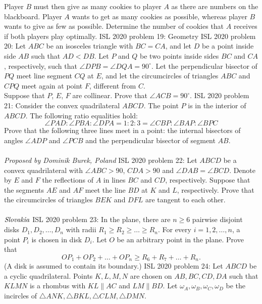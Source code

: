 Player $B$ must then give as many cookies to player $A$ as there are numbers on the blackboard. Player $A$ wants to get as many cookies as possible, whereas player $B$ wants to give as few as possible. Determine the number of cookies that $A$ receives if both players play optimally. 
ISL 2020 problem 19:  Geometry 
ISL 2020 problem 20:  Let $ABC$ be an isosceles triangle with $BC=CA$, and let $D$ be a point inside side $AB$ such that $AD< DB$. Let $P$ and $Q$ be two points inside sides $BC$ and $CA$, respectively, such that $\angle DPB = \angle DQA = 90^{\circ}$. Let the perpendicular bisector of $PQ$ meet line segment $CQ$ at $E$, and let the circumcircles of triangles $ABC$ and $CPQ$ meet again at point $F$, different from $C$. \\
Suppose that $P$, $E$, $F$ are collinear. Prove that $\angle ACB = 90^{\circ}$. 
ISL 2020 problem 21:  Consider the convex quadrilateral $ABCD$. The point $P$ is in the interior of $ABCD$. The following ratio equalities hold:
\[ \angle PAD:\angle PBA:\angle DPA=1:2:3=\angle CBP:\angle BAP:\angle BPC \]
Prove that the following three lines meet in a point: the internal bisectors of angles $\angle ADP$ and $\angle PCB$ and the perpendicular bisector of segment $AB$. \\\\
\textit{Proposed by Dominik Burek, Poland} 
ISL 2020 problem 22:  Let $ABCD$ be a convex quadrilateral with $\angle ABC>90$, $CDA>90$ and $\angle DAB=\angle BCD$. Denote by $E$ and $F$ the reflections of $A$ in lines $BC$ and $CD$, respectively. Suppose that the segments $AE$ and $AF$ meet the line $BD$ at $K$ and $L$, respectively. Prove that the circumcircles of triangles $BEK$ and $DFL$ are tangent to each other. \\\\
$\emph{Slovakia}$ 
ISL 2020 problem 23:  In the plane, there are $n \geqslant 6$ pairwise disjoint disks $D_1, D_2, \ldots, D_n$ with radii $R_1 \geqslant R_2 \geqslant \ldots \geqslant R_n$. For every $i=1,2, \ldots, n$, a point $P_i$ is chosen in disk $D_i$. Let $O$ be an arbitrary point in the plane. Prove that
\[ O P_1+O P_2+\ldots+O P_n \geqslant R_6+R_7+\ldots+R_n. \]
(A disk is assumed to contain its boundary.) 
ISL 2020 problem 24:  Let $ABCD$ be a cyclic quadrilateral. Points $K, L, M, N$ are chosen on $AB, BC, CD, DA$ such that $KLMN$ is a rhombus with $KL \parallel AC$ and $LM \parallel BD$. Let $\omega_A, \omega_B, \omega_C, \omega_D$ be the incircles of $\triangle ANK, \triangle BKL, \triangle CLM, \triangle DMN$. \\\\
